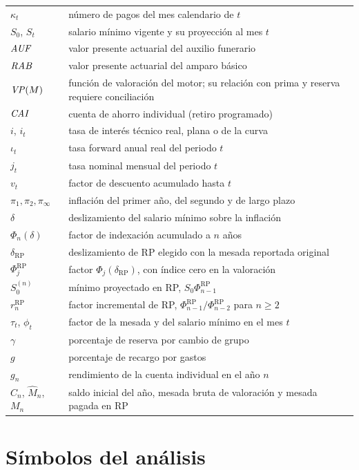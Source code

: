 \begin{longtable}{@{}p{}p{}@{}}
$\kappa_t$ & número de pagos del mes calendario de $t$ \\
$S_0$, $S_t$ & salario mínimo vigente y su proyección al mes $t$ \\
$\mathit{AUF}$ & valor presente actuarial del auxilio funerario \\
$\mathit{RAB}$ & valor presente actuarial del amparo básico \\
$\mathit{VP}(M)$ & función de valoración del motor; su relación con prima y reserva requiere conciliación \\
$\mathit{CAI}$ & cuenta de ahorro individual (retiro programado) \\
\midrule
$i$, $i_t$ & tasa de interés técnico real, plana o de la curva \\
$\iota_t$ & tasa forward anual real del periodo $t$ \\
$j_t$ & tasa nominal mensual del periodo $t$ \\
$v_t$ & factor de descuento acumulado hasta $t$ \\
$\pi_1,\pi_2,\pi_\infty$ & inflación del primer año, del segundo y de largo plazo \\
$\delta$ & deslizamiento del salario mínimo sobre la inflación \\
$\Phi_n(\delta)$ & factor de indexación acumulado a $n$ años \\
$\delta_{\mathrm{RP}}$ & deslizamiento de RP elegido con la mesada reportada original \\
$\Phi_j^{\mathrm{RP}}$ & factor $\Phi_j(\delta_{\mathrm{RP}})$, con índice cero en la valoración \\
$S_0^{(n)}$ & mínimo proyectado en RP, $S_0\Phi_{n-1}^{\mathrm{RP}}$ \\
$r_n^{\mathrm{RP}}$ & factor incremental de RP, $\Phi_{n-1}^{\mathrm{RP}}/\Phi_{n-2}^{\mathrm{RP}}$ para $n\ge2$ \\
$\tau_t$, $\phi_t$ & factor de la mesada y del salario mínimo en el mes $t$ \\
$\gamma$ & porcentaje de reserva por cambio de grupo \\
$g$ & porcentaje de recargo por gastos \\
$g_n$ & rendimiento de la cuenta individual en el año $n$ \\
$C_n$, $\widehat M_n$, $M_n$ & saldo inicial del año, mesada bruta de valoración y mesada pagada en RP \\
\bottomrule
\end{longtable}

\section*{Símbolos del análisis}

